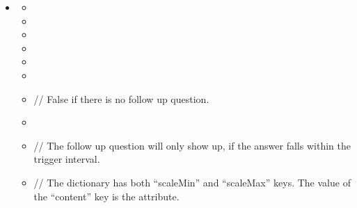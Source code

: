 \documentclass[a4paper]{scrreprt}
\begin{document}
\begin{itemize}
                    \item {}
                        \begin{itemize}
                            \item {}
                            \item {}
                            \item {}
                            \item {}
                            \item {}
                            \item {}
                            \item {}
                                \par // False if there is no follow up question.
                            \item {}
                            \item {}
                                \par // The follow up question will only show up, if the answer falls within the trigger interval.
                            \item {}
                               \par // The dictionary has both “scaleMin” and “scaleMax” keys. The value of the “content” key is the  attribute.
                        \end{itemize}
                        

\end{itemize}
\end{document}
